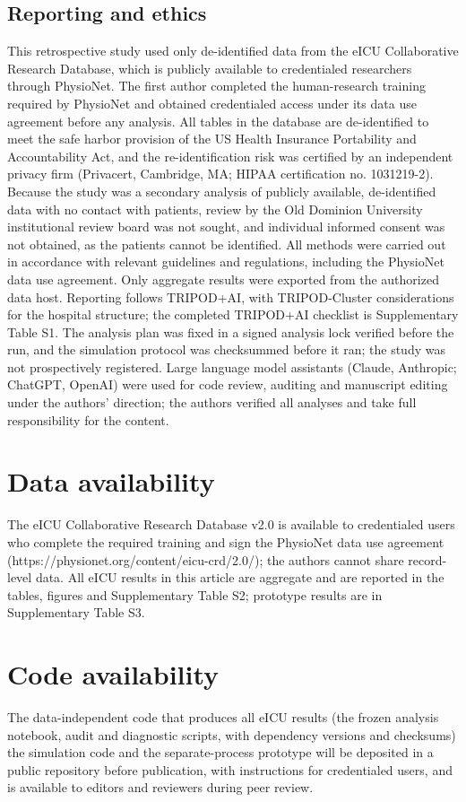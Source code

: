 \documentclass[11pt]{article}
\begin{document}
\subsection*{Reporting and ethics}
This retrospective study used only de-identified data from the eICU Collaborative Research Database, which is publicly available to credentialed researchers through PhysioNet\cite{r1}. The first author completed the human-research training required by PhysioNet and obtained credentialed access under its data use agreement before any analysis. All tables in the database are de-identified to meet the safe harbor provision of the US Health Insurance Portability and Accountability Act, and the re-identification risk was certified by an independent privacy firm (Privacert, Cambridge, MA; HIPAA certification no. 1031219-2)\cite{r2}. Because the study was a secondary analysis of publicly available, de-identified data with no contact with patients, review by the Old Dominion University institutional review board was not sought, and individual informed consent was not obtained, as the patients cannot be identified. All methods were carried out in accordance with relevant guidelines and regulations, including the PhysioNet data use agreement. Only aggregate results were exported from the authorized data host. Reporting follows TRIPOD+AI, with TRIPOD-Cluster considerations for the hospital structure\cite{r9,r19}; the completed TRIPOD+AI checklist is Supplementary Table S1. The analysis plan was fixed in a signed analysis lock verified before the run, and the simulation protocol was checksummed before it ran; the study was not prospectively registered. Large language model assistants (Claude, Anthropic; ChatGPT, OpenAI) were used for code review, auditing and manuscript editing under the authors' direction; the authors verified all analyses and take full responsibility for the content.

\section*{Data availability}
The eICU Collaborative Research Database v2.0 is available to credentialed users who complete the required training and sign the PhysioNet data use agreement (https://physionet.org/content/eicu-crd/2.0/); the authors cannot share record-level data. All eICU results in this article are aggregate and are reported in the tables, figures and Supplementary Table S2; prototype results are in Supplementary Table S3.

\section*{Code availability}
The data-independent code that produces all eICU results (the frozen analysis notebook, audit and diagnostic scripts, with dependency versions and checksums) the simulation code and the separate-process prototype will be deposited in a public repository before publication, with instructions for credentialed users, and is available to editors and reviewers during peer review.
\end{document}

